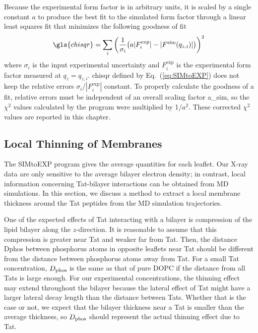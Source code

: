 Because the experimental form factor is in arbitrary units, it is 
scaled by a single constant $a$ to produce the best fit to the simulated
form factor through a linear least squares fit that minimizes the 
following goodness of fit
\begin{equation}
  \gls{chisqr} = \sum_i \left(\frac{1}{\sigma_i}\pars{
    a|F^\textrm{exp}_i| - |F^\textrm{sim}(q_{z,i})|
  }\right)^2
  \label{eq:SIMtoEXP}
\end{equation}
where $\sigma_i$ is the input experimental uncertainty and $F_i^\textrm{exp}$
is the experimental form factor measured at $q_z = q_{z,i}$.
\gls{chisqr} defined by Eq.~(\ref{eq:SIMtoEXP}) does not keep the relative errors
$\sigma_i$/$|F_i^\textrm{exp}|$ constant. 
To properly calculate the goodness of a fit, relative errors must be 
independent of an overall scaling factor \gls{a_sim}, so
the $\chi^2$ values calculated by the program were multiplied by 1/$a^2$. 
These corrected $\chi^2$ values are reported in this chapter.

\subsection{Local Thinning of Membranes}\label{sec:local_thinning}
The SIMtoEXP program gives the average quantities for each leaflet. 
Our X-ray data are only sensitive to the average bilayer electron density;
in contrast, local information concerning Tat-bilayer interactions can be obtained from MD simulations.
In this section, we discuss a method to extract a local membrane thickness
around the Tat peptides from the MD simulation trajectories. 

One of the expected effects of Tat interacting with a bilayer is 
compression of the lipid bilayer along the $z$-direction. It is 
reasonable to assume that this compression is greater near Tat and
weaker far from Tat.
Then, the distance \gls{Dphos} between phosphorus atoms in opposite
leaflets near Tat should be different from the distance between
phosphorus atoms away from Tat.  
For a small Tat concentration, $D_\text{phos}$ is the same as that of 
pure DOPC if the distance from all Tats is large enough.  
For our experimental concentrations, the thinning effect may extend throughout 
the bilayer because the lateral effect of Tat might have a larger lateral decay 
length than the distance between Tats. Whether that is the case or not, we 
expect that the bilayer thickness near a Tat is smaller than the average thickness,
so $D_\text{phos}$ should represent the actual thinning effect due to Tat. 

